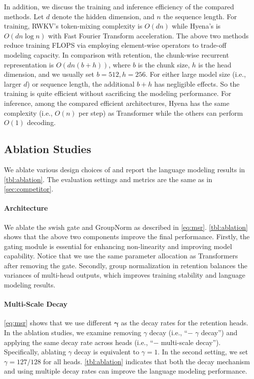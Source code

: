 In addition, we discuss the training and inference efficiency of the compared methods. Let $d$ denote the hidden dimension, and $n$ the sequence length. For training, RWKV's token-mixing complexity is $O(dn)$ while Hyena's is $O(dn\log n)$ with Fast Fourier Transform acceleration. The above two methods reduce training FLOPS via employing element-wise operators to trade-off modeling capacity. In comparison with retention, the chunk-wise recurrent representation is $O(dn(b+h))$, where $b$ is the chunk size, $h$ is the head dimension, and we usually set $b=512, h=256$. For either large model size (i.e., larger $d$) or sequence length, the additional $b+h$ has negligible effects. So the \our{} training is quite efficient without sacrificing the modeling performance. For inference, among the compared efficient architectures, Hyena has the same complexity (i.e., $O(n)$ per step) as Transformer while the others can perform $O(1)$ decoding.

\subsection{Ablation Studies}
\label{sec:ablation}

We ablate various design choices of \our{} and report the language modeling results in \ref{tbl:ablation}.
The evaluation settings and metrics are the same as in \ref{sec:competitor}.

\paragraph{Architecture}
We ablate the $\mathrm{swish}$ gate and $\mathrm{GroupNorm}$ as described in \ref{eq:msr}.
\ref{tbl:ablation} shows that the above two components improve the final performance. Firstly, the gating module is essential for enhancing non-linearity and improving model capability. Notice that we use the same parameter allocation as Transformers after removing the gate. Secondly, group normalization in retention balances the variances of multi-head outputs, which improves training stability and language modeling results.

\paragraph{Multi-Scale Decay}
\ref{eq:msr} shows that we use different $\mathbf{\gamma}$ as the decay rates for the retention heads. In the ablation studies, we examine removing $\gamma$ decay (i.e., ``$-$ $\gamma$ decay'') and applying the same decay rate across heads (i.e., ``$-$ multi-scale decay''). Specifically, ablating $\gamma$ decay is equivalent to $\gamma = 1$. In the second setting, we set $\gamma = 127/128$ for all heads.
\ref{tbl:ablation} indicates that both the decay mechanism and using multiple decay rates can improve the language modeling performance.

